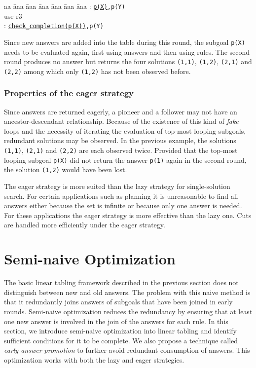 \documentclass{tlp}
\begin{document}
\begin{tabbing}
aa \= aaa \= aaa \= aaa \= aaa \= aaa \= aaa \kill
\> : {\tt \underline{p(X)},p(Y)} \\
\> \> \>  {\scriptsize use r3} \\
\> : {\tt \underline{check\_completion(p(X))},p(Y)} \\
\end{tabbing}      
Since new answers are added into the table during this round, the subgoal {\tt p(X)} needs to be evaluated again, first using answers and then using rules. The second round produces no answer but returns the four solutions {\tt (1,1)}, {\tt (1,2)}, {\tt (2,1)} and {\tt (2,2)} among which only {\tt (1,2)} has not been observed before.

\subsubsection{Properties of the eager strategy}
Since answers are returned eagerly, a pioneer and a follower may not have an ancestor-descendant relationship. Because of the existence of this kind of {\it fake} loops and the necessity of iterating the evaluation of top-most looping subgoals, redundant solutions may be observed. In the previous example, the solutions {\tt (1,1)}, {\tt (2,1)} and {\tt (2,2)} are each observed twice. Provided that the top-most looping subgoal {\tt p(X)} did not return the answer {\tt p(1)} again in the second round, the solution {\tt (1,2)} would have been lost.

The eager strategy is more suited than the lazy strategy for single-solution search. For certain applications such as planning it is unreasonable to find all answers either because the set is infinite or because only one answer is needed. For these applications the eager strategy is more effective than the lazy one. Cuts are handled more efficiently under the eager strategy.

\section{Semi-naive Optimization}
The basic linear tabling framework described in the previous section does not distinguish between new and old answers. The problem with this naive method is that it redundantly joins answers of subgoals that have been joined in early rounds. Semi-naive optimization \cite{Ullman88} reduces the redundancy by ensuring that at least one new answer is involved in the join of the answers for each rule. In this section, we introduce semi-naive optimization into linear tabling and identify sufficient conditions for it to be complete. We also propose a technique called {\it early answer promotion} to further avoid redundant consumption of answers. This optimization works with both the lazy and eager strategies.
\end{document}
